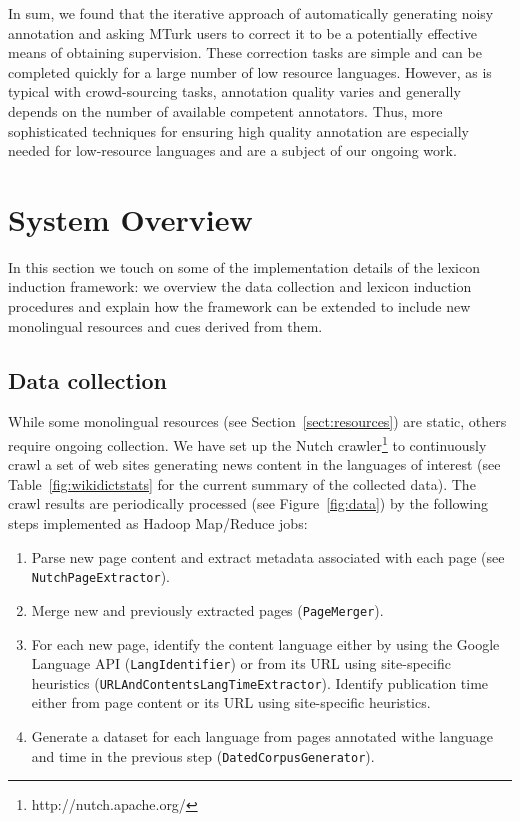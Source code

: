 \documentclass{article}
\newcommand{\secref}[1]{Section~\ref{#1}}
\newcommand{\tabref}[1]{Table~\ref{#1}}
\newcommand{\figref}[1]{Figure~\ref{#1}}
\newcommand{\code}[1]{{\small \tt #1}}
\begin{document}
In sum, we found that the iterative approach of automatically generating noisy annotation and asking MTurk users to correct it to be a potentially effective means of obtaining supervision.  These correction tasks are simple and can be completed quickly for a large number of low resource languages.  However, as is typical with crowd-sourcing tasks, annotation quality varies and generally depends on the number of available competent annotators.  Thus, more sophisticated techniques for ensuring high quality annotation are especially needed for low-resource languages and are a subject of our ongoing work.

\section{System Overview}

In this section we touch on some of the implementation details of the lexicon induction framework: we overview the data collection and lexicon induction procedures and explain how the framework can be extended to include new monolingual resources and cues derived from them.  

\subsection{Data collection} \label{sect:datacollect}

While some monolingual resources (see \secref{sect:resources}) are static, others require ongoing collection.  We have set up the Nutch crawler\footnote{http://nutch.apache.org/} to continuously crawl a set of web sites generating news content in the languages of interest (see \tabref{fig:wikidictstats} for the current summary of the collected data).  The crawl results are periodically processed (see \figref{fig:data}) by the following steps implemented as Hadoop Map/Reduce jobs:

\begin{enumerate}
 \item Parse new page content and extract metadata associated with each page (see \code{NutchPageExtractor}).
 \item Merge new and previously extracted pages (\code{PageMerger}).
 \item For each new page, identify the content language either by using the Google Language API (\code{LangIdentifier}) or from its URL using site-specific heuristics (\code{URLAndContentsLangTimeExtractor}).  Identify publication time either from page content or its URL using site-specific heuristics.
 \item Generate a dataset for each language from pages annotated withe language and time in the previous step (\code{DatedCorpusGenerator}).  
\end{enumerate}
\end{document}
